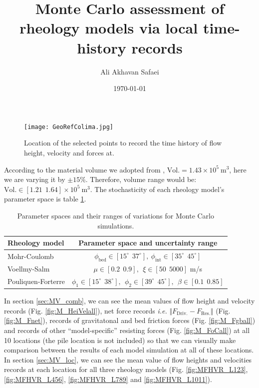 \documentclass[a4paper,10pt]{article}
\begin{document}
\title{\bf Monte Carlo assessment of rheology models via local time-history records}
\author{Ali Akhavan Safaei}
\date{\today}
\maketitle

\begin{figure}[H]
	\centering
	\texttt{[image: GeoRefColima.jpg]}
	\caption{Location of the selected points to record the time history of flow height, velocity and forces at.}\label{fig:Colima}
\end{figure}
According to the material volume we adopted from \cite{Rupp2006}, $\mathrm{Vol.} = 1.43\times10^5 \ \mathrm{m}^3$, here we are varying it by $\pm15\%$. Therefore, volume range would be: $\mathrm{Vol.} \in [1.21 \ \ 1.64] \times10^5 \ \mathrm{m}^3$. The stochasticity of each rheology model's parameter space is table \ref{tab:Para}. 
\begin{table}[H]
\begin{center}
\caption{ Parameter spaces and their ranges of variations for Monte Carlo simulations.}
\label{tab:Para}
	\begin{tabular}{lc}
    \hline
    \textbf{Rheology model} & \textbf{Parameter space and uncertainty range} \\
    \hline
    Mohr-Coulomb & $\phi_{\mathrm{bed}} \in [15^{\circ} \ \ 37^{\circ}], \ \phi_{\mathrm{int}}\in[35^{\circ} \ \ 45^{\circ}]$ \\
    Voellmy-Salm & $\mu\in[0.2 \ \ 0.9], \ \ \xi\in[50 \ \ 5000]$ m/s \\
    Pouliquen-Forterre & $\phi_1\in[15^{\circ} \ \ 38^{\circ}], \ \ \phi_2\in[39^{\circ} \ \ 45^{\circ}], \ \ \beta\in[0.1 \ \ 0.85]$ \\
    \hline
	\end{tabular}
\end{center}
\end{table}
In section \ref{sec:MV_comb}, we can see the mean values of flow height and velocity records (Fig. \ref{fig:M_HeiVelall}), net force records \textit{i.e.} $\Vert F_{\mathrm{Driv.}} - F_{\mathrm{Res.}} \Vert$ (Fig. \ref{fig:M_Fnet}), records of gravitatonal and bed friction forces (Fig. \ref{fig:M_Fgball}) and records of other ``model-specific'' resisting forces (Fig. \ref{fig:M_FoCall}) at all 10 locations (the pile location is not included) so that we can visually make comparison between the results of each model simulation at all of these locations. In section \ref{sec:MV_loc}, we can see the mean value of flow heights and velocities records at each location for all three rheology models (Fig. \ref{fig:MFHVR_L123}, \ref{fig:MFHVR_L456}, \ref{fig:MFHVR_L789} and \ref{fig:MFHVR_L1011}).
\end{document}
